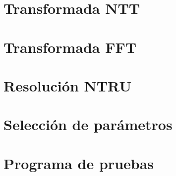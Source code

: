 \section{Transformada NTT}


\clearpage
\section{Transformada FFT}


\clearpage
\section{Resolución NTRU}


\clearpage
\section{Selección de parámetros}


\clearpage
\section{Programa de pruebas}


\endgroup

